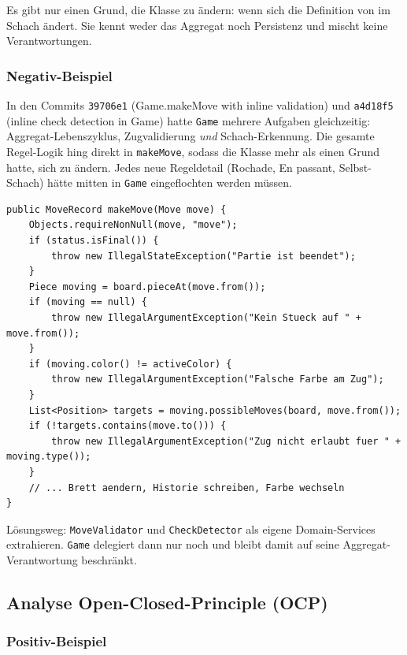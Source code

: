 \documentclass[a4paper,12pt]{article}
\begin{document}
Es gibt nur einen Grund, die Klasse zu ändern: wenn sich die Definition von \glqq{}im
Schach\grqq{} ändert. Sie kennt weder das Aggregat noch Persistenz und mischt keine Verantwortungen.

\subsubsection*{Negativ-Beispiel}

In den Commits \texttt{39706e1} (\glqq{}Game.makeMove with inline validation\grqq{}) und
\texttt{a4d18f5} (\glqq{}inline check detection in Game\grqq{}) hatte \texttt{Game} mehrere
Aufgaben gleichzeitig: Aggregat-Lebenszyklus, Zugvalidierung \emph{und} Schach-Erkennung. Die
gesamte Regel-Logik hing direkt in \texttt{makeMove}, sodass die Klasse mehr als einen Grund hatte,
sich zu ändern. Jedes neue Regeldetail (Rochade, En passant, Selbst-Schach) hätte mitten in
\texttt{Game} eingeflochten werden müssen.

\begin{lstlisting}[caption={Game.makeMove (Stand \texttt{39706e1}): Validierung inline im Aggregat}]
public MoveRecord makeMove(Move move) {
    Objects.requireNonNull(move, "move");
    if (status.isFinal()) {
        throw new IllegalStateException("Partie ist beendet");
    }
    Piece moving = board.pieceAt(move.from());
    if (moving == null) {
        throw new IllegalArgumentException("Kein Stueck auf " + move.from());
    }
    if (moving.color() != activeColor) {
        throw new IllegalArgumentException("Falsche Farbe am Zug");
    }
    List<Position> targets = moving.possibleMoves(board, move.from());
    if (!targets.contains(move.to())) {
        throw new IllegalArgumentException("Zug nicht erlaubt fuer " + moving.type());
    }
    // ... Brett aendern, Historie schreiben, Farbe wechseln
}
\end{lstlisting}

Lösungsweg: \texttt{MoveValidator} und \texttt{CheckDetector} als eigene Domain-Services
extrahieren. \texttt{Game} delegiert dann nur noch und bleibt damit auf seine Aggregat-Verantwortung
beschränkt.

\newpage

\subsection*{Analyse Open-Closed-Principle (OCP)}

\subsubsection*{Positiv-Beispiel}
\end{document}
